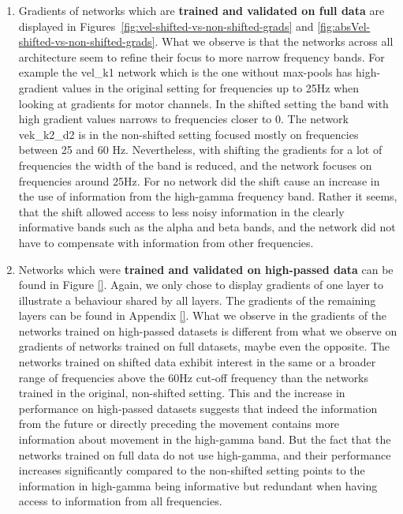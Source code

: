 \begin{enumerate}
    \item Gradients of networks which are \textbf{trained and validated on full data} are displayed in Figures~\ref{fig:vel-shifted-vs-non-shifted-grads} and \ref{fig:absVel-shifted-vs-non-shifted-grads}.
    What we observe is that the networks across all architecture seem to refine their focus to more narrow frequency bands.
    For example the vel\_k1 network which is the one without max-pools has high-gradient values in the original setting for frequencies up to 25Hz when looking at gradients for motor channels.
    In the shifted setting the band with high gradient values narrows to frequencies closer to 0.
    The network vek\_k2\_d2 is in the non-shifted setting focused mostly on frequencies between 25 and 60 Hz. Nevertheless, with shifting the gradients for a lot of frequencies the width of the band is reduced, and the network focuses on frequencies around 25Hz. For no network did the shift cause an increase in the use of information from the high-gamma frequency band.
    Rather it seems, that the shift allowed access to less noisy information in the clearly informative bands such as the alpha and beta bands, and the network did not have to compensate with information from other frequencies.
    \item Networks which were \textbf{trained and validated on high-passed data} can be found in Figure \ref{}.
    Again, we only chose to display gradients of one layer to illustrate a behaviour shared by all layers. The gradients of the remaining layers can be found in Appendix \ref{}.
    What we observe in the gradients of the networks trained on high-passed datasets is different from what we observe on gradients of networks trained on full datasets, maybe even the opposite.
    The networks trained on shifted data exhibit interest in the same or a broader range of frequencies above the 60Hz cut-off frequency than the networks trained in the original, non-shifted setting.
    This and the increase in performance on high-passed datasets suggests that indeed the information from the future or directly preceding the movement contains more information about movement in the high-gamma band.
    But the fact that the networks trained on full data do not use high-gamma, and their performance increases significantly compared to the non-shifted setting points to the information in high-gamma being informative but redundant when having access to information from all frequencies.
\end{enumerate}

